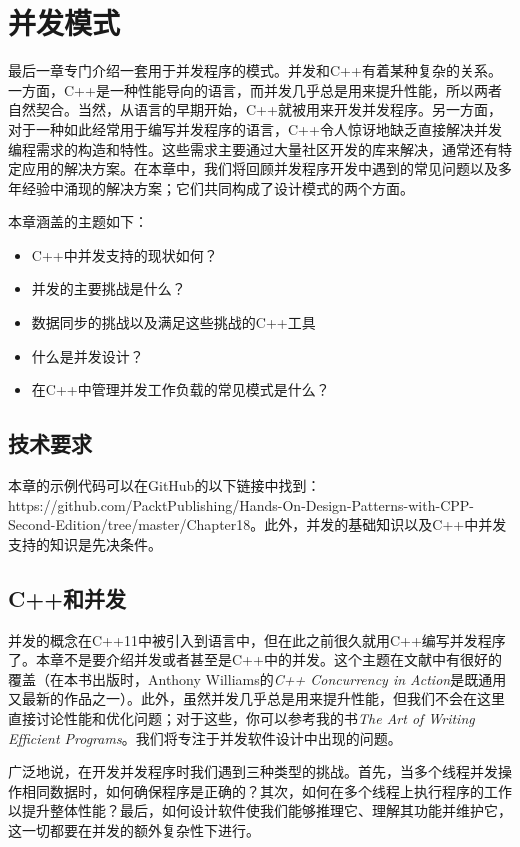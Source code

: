 ﻿\chapter{并发模式}

最后一章专门介绍一套用于并发程序的模式。并发和C++有着某种复杂的关系。一方面，C++是一种性能导向的语言，而并发几乎总是用来提升性能，所以两者自然契合。当然，从语言的早期开始，C++就被用来开发并发程序。另一方面，对于一种如此经常用于编写并发程序的语言，C++令人惊讶地缺乏直接解决并发编程需求的构造和特性。这些需求主要通过大量社区开发的库来解决，通常还有特定应用的解决方案。在本章中，我们将回顾并发程序开发中遇到的常见问题以及多年经验中涌现的解决方案；它们共同构成了设计模式的两个方面。

本章涵盖的主题如下：

\begin{itemize}
\item
  C++中并发支持的现状如何？
\item
  并发的主要挑战是什么？
\item
  数据同步的挑战以及满足这些挑战的C++工具
\item
  什么是并发设计？
\item
  在C++中管理并发工作负载的常见模式是什么？
\end{itemize}

\section{技术要求}

本章的示例代码可以在GitHub的以下链接中找到：https://github.com/PacktPublishing/Hands-On-Design-Patterns-with-CPP-Second-Edition/tree/master/Chapter18。此外，并发的基础知识以及C++中并发支持的知识是先决条件。

\section{C++和并发}

并发的概念在C++11中被引入到语言中，但在此之前很久就用C++编写并发程序了。本章不是要介绍并发或者甚至是C++中的并发。这个主题在文献中有很好的覆盖（在本书出版时，Anthony Williams的\emph{C++ Concurrency in Action}是既通用又最新的作品之一）。此外，虽然并发几乎总是用来提升性能，但我们不会在这里直接讨论性能和优化问题；对于这些，你可以参考我的书\emph{The Art of Writing Efficient Programs}。我们将专注于并发软件设计中出现的问题。

广泛地说，在开发并发程序时我们遇到三种类型的挑战。首先，当多个线程并发操作相同数据时，如何确保程序是正确的？其次，如何在多个线程上执行程序的工作以提升整体性能？最后，如何设计软件使我们能够推理它、理解其功能并维护它，这一切都要在并发的额外复杂性下进行。

